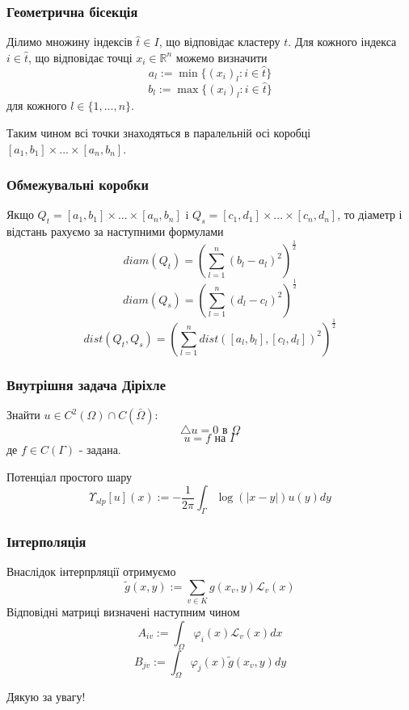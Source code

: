 \documentclass[12pt]{beamer}
\begin{document}
\begin{frame}
\frametitle{Геометрична бісекція}
\begin{block}{}
	Ділимо множину індексів $\hat t\in I$, що відповідає кластеру $t$. Для кожного індекса $i \in \hat t$, що відповідає точці $x_i\in\mathbb{R}^n$ можемо визначити
	$$a_l:=\min \{(x_i)_l : i\in \hat t\}$$
	$$b_l:=\max \{(x_i)_l : i\in \hat t\}$$
	для кожного $l\in \{1,...,n\}$. 
	\par Таким чином всі точки знаходяться в паралельній осі коробці $[a_1,b_1]\times...\times[a_n,b_n]$.
\end{block}
\end{frame}
\begin{frame}
\frametitle{Обмежувальні коробки}
\begin{block}{}
Якщо $Q_t=[a_1,b_1]\times...\times[a_n,b_n]$ i $Q_s=[c_1,d_1]\times...\times[c_n,d_n]$, то діаметр і відстань рахуємо за наступними формулами
$$diam(Q_t)=\left(\sum_{l=1}^{n}(b_l-a_l)^2\right)^\frac{1}{2}$$
$$diam(Q_s)=\left(\sum_{l=1}^{n}(d_l-c_l)^2\right)^\frac{1}{2}$$
$$dist(Q_t,Q_s)=\left(\sum_{l=1}^{n}dist([a_l,b_l],[c_l,d_l])^2\right)^\frac{1}{2}$$
\end{block}
\end{frame}
\begin{frame}
\frametitle{Внутрішня задача Діріхле}
\begin{block}{}
Знайти $u\in C^2(\Omega)\cap C(\bar{\Omega}):$
$$\triangle u=0 \text{ в }\Omega$$
$$u=f\text{ на }\Gamma$$
де $f\in C(\Gamma)$ - задана.
\end{block}
\begin{block}{Потенціал простого шару}
$$\Upsilon_{slp}[u](x):=-\frac{1}{2\pi}\int_{\Gamma}\log(|x-y|)u(y)dy$$
\end{block}
\end{frame}
\begin{frame}
\frametitle{Інтерполяція}
\begin{block}{}
Внаслідок інтерпрляції отримуємо
$$\tilde{g}(x,y):=\sum_{v\in K}g(x_v,y)\mathcal{L}_v(x)$$
Відповідні матриці визначені наступним чином
$$A_{iv}:=\int_{\Omega}\varphi_i(x)\mathcal{L}_v(x)dx$$
$$B_{jv}:=\int_{\Omega}\varphi_j(x)\tilde{g}(x_v,y)dy$$
\end{block}
\end{frame}

\begin{frame}
\begin{block}{}
\begin{center}
\Huge{Дякую за увагу!}
\end{center}	
\end{block}
\end{frame}
\end{document}
